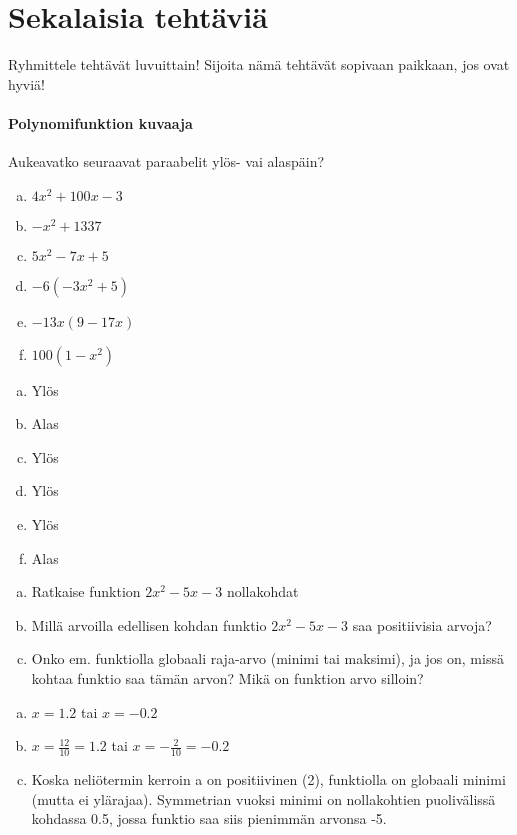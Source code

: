 \section{Sekalaisia tehtäviä}

Ryhmittele tehtävät luvuittain!
Sijoita nämä tehtävät sopivaan paikkaan, jos ovat hyviä!


\paragraph*{Polynomifunktion kuvaaja}

\begin{tehtava}
  Aukeavatko seuraavat paraabelit ylös- vai alaspäin?
  \begin{enumerate}[a)]
    \item $4x^2 + 100x - 3$
    \item $-x^2 + 1337$
    \item $5x^2 - 7x + 5$
    \item $-6(-3x^2 + 5)$
    \item $-13x(9 - 17x)$
    \item $100(1-x^2)$
  \end{enumerate}

  \begin{vastaus}
    \begin{enumerate}[a)]
      \item Ylös
      \item Alas
      \item Ylös
      \item Ylös
      \item Ylös
      \item Alas
    \end{enumerate}
  \end{vastaus}
\end{tehtava}

\begin{tehtava}
  \begin{enumerate}[a)]
    \item Ratkaise funktion $2x^2 - 5x - 3$ nollakohdat
    \item Millä arvoilla edellisen kohdan funktio $2x^2 - 5x - 3$ saa positiivisia arvoja?
    \item Onko em. funktiolla globaali raja-arvo (minimi tai maksimi), ja jos on, missä kohtaa funktio saa tämän arvon? Mikä on funktion arvo silloin?
  \end{enumerate}

  \begin{vastaus}
    \begin{enumerate}[a)]
      \item $x = 1.2$ tai $x = -0.2$
      \item $x = \frac{12}{10} = 1.2$ tai $x = -\frac{2}{10} = -0.2$
      \item Koska neliötermin kerroin a on positiivinen (2), funktiolla on globaali minimi (mutta ei ylärajaa). Symmetrian vuoksi minimi on nollakohtien puolivälissä kohdassa 0.5, jossa funktio saa siis pienimmän arvonsa -5.
    \end{enumerate}
  \end{vastaus}
\end{tehtava}

